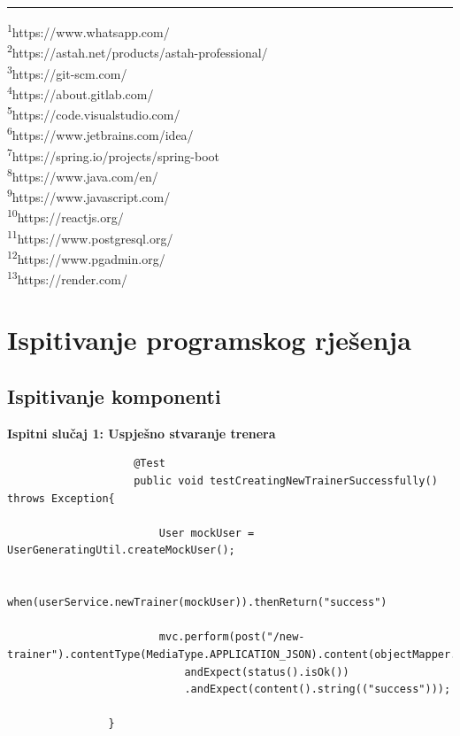 			\noindent\rule{8cm}{0.4pt}
			
			\noindent\textsuperscript{1}https://www.whatsapp.com/ \\
			\textsuperscript{2}https://astah.net/products/astah-professional/ \\
			\textsuperscript{3}https://git-scm.com/ \\
			\textsuperscript{4}https://about.gitlab.com/ \\
			\textsuperscript{5}https://code.visualstudio.com/ \\
			\textsuperscript{6}https://www.jetbrains.com/idea/ \\
			\textsuperscript{7}https://spring.io/projects/spring-boot \\
			\textsuperscript{8}https://www.java.com/en/ \\
			\textsuperscript{9}https://www.javascript.com/ \\
			\textsuperscript{10}https://reactjs.org/ \\
			\textsuperscript{11}https://www.postgresql.org/ \\
			\textsuperscript{12}https://www.pgadmin.org/ \\
			\textsuperscript{13}https://render.com/ \\
			
			
			
			
			\eject 
		
	
		\section{Ispitivanje programskog rješenja}
			
		
	
			
			\subsection{Ispitivanje komponenti}
		
			
			\textbf{Ispitni slučaj 1: Uspješno stvaranje trenera}\\
				\begin{verbatim}
					@Test
					public void testCreatingNewTrainerSuccessfully() throws Exception{
					
						User mockUser = UserGeneratingUtil.createMockUser();
						
						when(userService.newTrainer(mockUser)).thenReturn("success")
						
						mvc.perform(post("/new-trainer").contentType(MediaType.APPLICATION_JSON).content(objectMapper.writeValueAsString(mockUser))).
							andExpect(status().isOk())
							.andExpect(content().string(("success")));
							
				}
				\end{verbatim}\\\\
			
